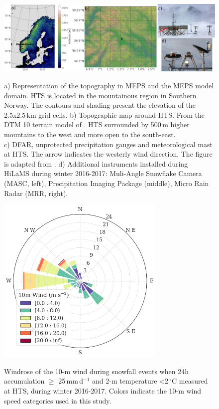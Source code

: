 \documentclass{ametsocV5}
\begin{document}
\begin{figure}[t]
	\noindent\includegraphics[width=\textwidth,angle=0]{fig1.jpg}\\
	\caption{
		a) Representation of the topography in MEPS and the MEPS model domain. HTS is located in the mountainous region in Southern Norway. The contours and shading present the elevation of the 2.5x2.5\,km grid cells. b) Topographic map around HTS. From the DTM 10 terrain model of \protect\citet{geonorge_dtm_2018}. HTS surrounded by 500\,m higher mountains to the west and more open to the south-east. \\ 
		c) DFAR, unprotected precipitation gauges and meteorological mast at HTS. The arrow indicates the westerly wind direction. The figure is adapted from \protect\citet{wolff_derivation_2015}. d) Additional instruments installed during HiLaMS during winter 2016-2017: Muli-Angle Snowflake Camera (MASC, left), Precipitation Imaging Package (middle), Micro Rain Radar (MRR, right).
	}
	\label{fig:norway_map}
\end{figure}


\begin{figure}[t]
	\noindent\includegraphics[width=19pc,angle=0]{fig2.png}\\
	\caption{Windrose of the 10-m wind during snowfall events when 24h accumulation $\geq$ 25\,mm\,d$^{-1}$ and 2-m temperature \textless 2\,$^{\circ}$C measured at HTS, during winter 2016-2017. Colors indicate the 10-m wind speed categories used in this study. 
	}
	\label{fig:windrose}
\end{figure}
\end{document}
